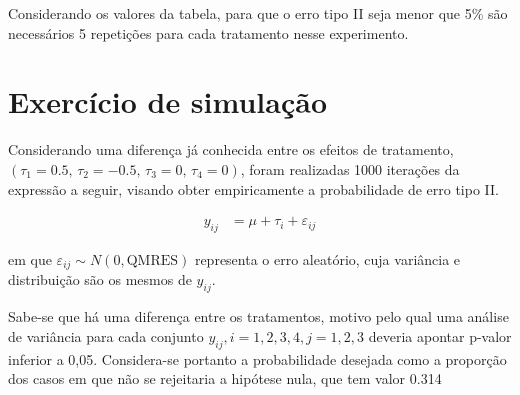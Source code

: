 \documentclass[
]{article}
\begin{document}
Considerando os valores da tabela, para que o erro tipo II seja menor
que 5\% são necessários 5 repetições para cada tratamento nesse
experimento.

\hypertarget{exercuxedcio-de-simulauxe7uxe3o}{%
\section{Exercício de simulação}\label{exercuxedcio-de-simulauxe7uxe3o}}

Considerando uma diferença já conhecida entre os efeitos de tratamento,
\((\tau_1 = 0.5, \, \tau_2 = -0.5, \, \tau_3 = 0, \, \tau_4 = 0)\),
foram realizadas 1000 iterações da expressão a seguir, visando obter
empiricamente a probabilidade de erro tipo II.

\begin{align}
  y_{ij} &= \mu + \tau_i + \varepsilon_{ij}
\end{align}

em que \(\varepsilon_{ij} \sim N(0, \text{QMRES})\) representa o erro
aleatório, cuja variância e distribuição são os mesmos de \(y_{ij}\).

Sabe-se que há uma diferença entre os tratamentos, motivo pelo qual uma
análise de variância para cada conjunto
\(y_{ij}, i = 1, 2, 3, 4, j = 1,2,3\) deveria apontar p-valor inferior a
0,05. Considera-se portanto a probabilidade desejada como a proporção
dos casos em que não se rejeitaria a hipótese nula, que tem valor 0.314
\end{document}
